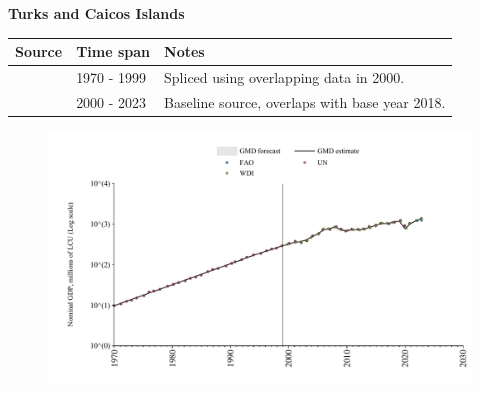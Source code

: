 \documentclass[12pt,a4paper,landscape]{article}
\begin{document}
\begin{adjustbox}{max totalsize={\paperwidth}{\paperheight},center}
\begin{minipage}[t][\textheight][t]{\textwidth}
\vspace*{0.5cm}
{}
\begin{center}
{\Large\bfseries Turks and Caicos Islands}
\end{center}
\vspace{0.5cm}
\begin{table}[H]
\centering
\small
\begin{tabular}{|l|l|l|}
\hline
\textbf{Source} & \textbf{Time span} & \textbf{Notes} \\
\hline
\rowcolor{white}\cite{UN}& 1970 - 1999 &Spliced using overlapping data in 2000.\\
\rowcolor{lightgray}\cite{WDI}& 2000 - 2023 &Baseline source, overlaps with base year 2018.\\
\hline
\end{tabular}
\end{table}
\begin{figure}[H]
\centering
\includegraphics[width=\textwidth,height=0.6\textheight,keepaspectratio]{graphs/TCA_nGDP.pdf}
\end{figure}
\end{minipage}
\end{adjustbox}
\end{document}
